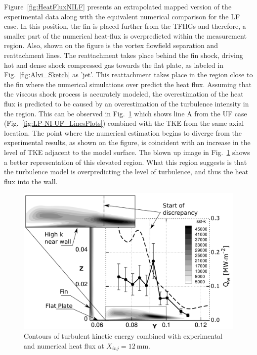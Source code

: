 \documentclass{AIAA}
\begin{document}
Figure~\ref{fig:HeatFluxNILF} presents an extrapolated mapped version of the experimental data along with the equivalent numerical comparison for the LF case.
In this position, the fin is placed further from the TFHGs and therefore, a smaller part of the numerical heat-flux is overpredicted within the measurement region.
Also, shown on the  figure is the vortex flowfield separation and reattachment lines.
The reattachment takes place behind the fin shock, driving hot and dense shock compressed gas towards the flat plate, as labeled in Fig.~\ref{fig:Alvi_Sketch} as 'jet'.
This reattachment takes place in the region close to the fin where the numerical simulations over predict the heat flux.
Assuming that the viscous shock process is accurately modeled, the overestimation of the heat flux is predicted to be caused by an overestimation of the turbulence intensity in the region.
This can be observed in Fig.~\ref{fig:SSTk_Q_Combi} which shows line A from the UF case (Fig.~\ref{fig:LP-NI-UF_LinesPlots}) combined with the TKE from the same axial location.
The point where the numerical estimation begins to diverge from the experimental results, as shown on the figure, is coincident with an increase in the level of TKE adjacent to the model surface.
The blown up image in Fig.~\ref{fig:SSTk_Q_Combi} shows a better representation of this elevated region.
What this region suggests is that the turbulence model is overpredicting the level of turbulence, and thus the heat flux into the wall.


%
\begin{figure}[!h]
\center
\includegraphics[width=0.70\columnwidth,valign=t]{Figures/SST-K_X137_LP_NI_UF_Q_and_SSTk_Combined.pdf}
\caption{Contours of turbulent kinetic energy combined with experimental and numerical heat flux at $X_{inj} = \SI{12}{\milli\meter}$.}
\label{fig:SSTk_Q_Combi}
\end{figure} 
\end{document}
